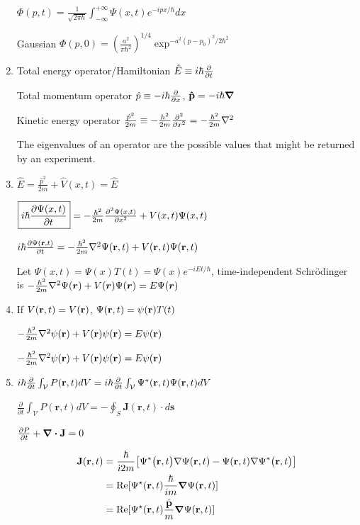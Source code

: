 \documentclass{article}
\theoremstyle{remark}
\theoremstyle{remark}
\begin{document}
\begin{enumerate}
        $\Phi(p,t)={\frac{1}{\sqrt{2\pi\hbar}}}\int_{-\infty}^{+\infty}\Psi(x,t)e^{-i p x/\hbar}d x$

    Gaussian $\Phi(p,0)=\left({\frac{a^{2}}{\pi\hbar^{2}}}\right)^{1/4}\exp^{-a^{2}(p-p_{0})^{2}/2\hbar^{2}}$

    \item Total energy operator/Hamiltonian $\hat{E} \equiv i\hbar\pdv{t}$
    
    Total momentum operator $\hat{p}\equiv -i\hbar\pdv{x}$, $\vb{\hat{p}}=-i\hbar\grad$

    Kinetic energy operator $\frac{\hat{p}^2}{2m}\equiv -\frac{h^2}{2m}\pdv[2]{x} = -\frac{\hbar^2}{2m}\laplacian$

    The eigenvalues of an operator are the possible values that might be returned by an experiment.


    \item $\hat{E}=\frac{\hat{p}^2}{2m}+\hat{V}(x,t)=\hat{E}$
    
        $\boxed{i\hbar\pdv{\Psi(x,t)}{t}}=-\frac{\hbar^2}{2m}\pdv[2]{\Psi(x,t)}{x}+V(x,t)\Psi(x,t)$

        $i\hbar\pdv{\Psi(\vb{r},t)}{t}=-\frac{\hbar^2}{2m}\laplacian{\Psi(\vb{r},t)}+V(\vb{r},t)\Psi(\vb{r},t)$

        Let $\Psi(x,t)=\Psi(x)T(t) = \Psi(x)e^{-iEt/\hbar}$, time-independent Schr\"odinger is $-\frac{h^2}{2m}\laplacian{\Psi(\bm{r})}+V(\bm{r})\Psi(\bm{r})=E\Psi(\bm{r})$

    \item If $V(\vb{r},t)=V(\vb{r})$, $\Psi(\vb{r},t)=\psi(\vb{r})T(t)$
    
        $-\frac{\hbar^{2}}{2m}\nabla^{2}\psi({\bf r})+V({\bf r})\psi({\bf r})=E\psi({\bf r})$

        $-\frac{\hbar^{2}}{2m}\nabla^{2}\psi({\bf r})+V({\bf r})\psi({\bf r})=E\psi({\bf r})$

    \item $i\hbar\pdv{t}\int_{\mathcal{V}}P(\mathbf{r},t)d V=i\hbar\pdv{t}\int_{\mathcal{V}}\Psi^{\ast}(\mathbf{r},t)\Psi(\mathbf{r},t)d V$
    
        $\boxed{{\frac{\partial}{\partial t}}\int_{\mathcal{V}}P(\mathbf{r},t)d V=-\oint_{S}\mathbf{J}(\mathbf{r},t)\cdot d\mathbf{s}}$
        
        $\pdv{P}{t}+\div\vb{J} = 0$

        \begin{align*}\mathbf{J}(\mathbf{r},t)&=\frac{\hbar}{\dot{\imath}2m}\bigl[\Psi^{*}\bigl(\mathbf{r},t\bigr)\nabla\Psi(\mathbf{r},t)-\Psi(\mathbf{r},t)\nabla\Psi^{*}\bigl(\mathbf{r},t\bigr)\bigr]  \\
            &= \Re[\Psi^{\star}(\vb{r}, t)\frac{\hbar}{im}\grad\Psi(\vb{r},t)] \\
            &= \Re[\Psi^{\star}(\vb{r}, t)\frac{\hat{\vb{p}}}{m}\grad\Psi(\vb{r},t)]\end{align*}


\end{enumerate}
\end{document}
